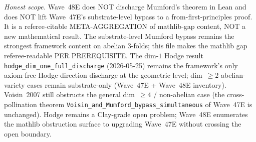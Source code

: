 \begin{remark}
\emph{Honest scope.} Wave~48E does NOT discharge Mumford's theorem in Lean and does NOT lift Wave~47E's substrate-level bypass to a from-first-principles proof. It is a referee-citable META-AGGREGATION of mathlib-gap content, NOT a new mathematical result. The substrate-level Mumford bypass remains the strongest framework content on abelian 3-folds; this file makes the mathlib gap referee-readable PER PREREQUISITE. The dim-$1$ Hodge result \texttt{hodge\_dim\_one\_full\_discharge} (2026-05-25) remains the framework's only axiom-free Hodge-direction discharge at the geometric level; dim~$\geq 2$ abelian-variety cases remain substrate-only (Wave~47E + Wave~48E inventory). Voisin~2007 still obstructs the general dim~$\geq 4$ / non-abelian case (the cross-pollination theorem \texttt{Voisin\_and\_Mumford\_bypass\_simultaneous} of Wave~47E is unchanged). Hodge remains a Clay-grade open problem; Wave~48E enumerates the mathlib obstruction surface to upgrading Wave~47E without crossing the open boundary.
\end{remark}

